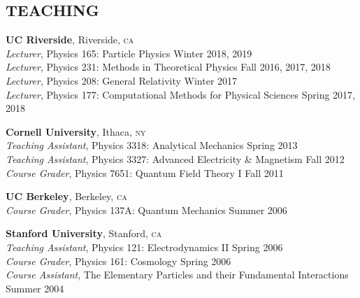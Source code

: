 \documentclass[margin,line]{resume}
\newcommand{\scap}[1]{\textsc{\MakeLowercase{#1}}}
\begin{document}
\begin{resume}
\section{\footnotesize \sc
\sffamily 
{}
TEACHING
}

\textbf{UC Riverside}, Riverside, \scap{CA}
\\
\vspace{0mm}%
%
\textsl{Lecturer}, Physics 165: Particle Physics
\hfill {Winter 2018, 2019}\\
\vspace{0mm}%
%
\textsl{Lecturer}, Physics 231: Methods in Theoretical Physics
\hfill {Fall 2016, 2017, 2018}\\
\vspace{0mm}%
%
\textsl{Lecturer}, Physics 208: General Relativity
\hfill {Winter 2017}\\
%
\textsl{Lecturer}, Physics 177: Computational Methods for Physical Sciences
\hfill {Spring 2017, 2018}%

\textbf{Cornell University}, Ithaca, \scap{NY} 
\\
\vspace{0mm}%
%
\textsl{Teaching Assistant}, Physics 3318: Analytical Mechanics 
\hfill {Spring 2013}\\
\vspace{0mm}%
%
\textsl{Teaching Assistant}, Physics 3327: Advanced Electricity \& Magnetism 
\hfill {Fall 2012}\\
\vspace{0mm}%
%
\textsl{Course Grader}, Physics 7651: Quantum Field Theory I 
\hfill {Fall 2011}




\textbf{UC Berkeley}, Berkeley, \scap{CA} 
\\
\vspace{0mm}%
%
\textsl{Course Grader}, Physics 137A: Quantum Mechanics 
\hfill {Summer 2006}



\textbf{Stanford University}, Stanford, \scap{CA} 
\\
\vspace{0mm}%
\textsl{Teaching Assistant}, Physics 121: Electrodynamics II 
\hfill {Spring 2006}\\
%
\textsl{Course Grader}, Physics 161: Cosmology 
\hfill {Spring 2006}\\
%	
\textsl{Course Assistant}, The Elementary Particles and their Fundamental Interactions 
\hfill {Summer 2004}\\
\vspace{-3mm}


\end{resume}
\end{document}
